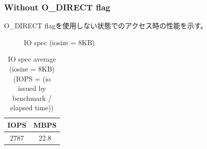 \documentclass[11pt,a4paper]{jsarticle}
\newlength{\subfigwidth}
\newlength{\subfigcolsep}
\begin{document}
\subsubsection{Without O\_DIRECT flag}
O\_DIRECT flagを使用しない状態でのアクセス時の性能を示す。
\begin{figure}[thbp]
 \setlength{\subfigwidth}{.5\linewidth}
 \addtolength{\subfigwidth}{-.5\subfigcolsep}
 \begin{minipage}[b]{\subfigwidth}
 \end{minipage}
  \begin{minipage}[b]{\subfigwidth}
  \end{minipage}
  \caption{IO spec (iosize = 8KB)}
  \label{fig:rand8192}
\end{figure}

\begin{table}[htbp]
 \begin{center}
  \caption{IO spec average (iosize = 8KB) \newline
  (IOPS = (io issued by benchmark / elapsed time))}
  \label{tbl:rand8192}
 \begin{tabular}{cc} \hline
  IOPS & MBPS \\ \hline
  2787 & 22.8 \\ \hline
 \end{tabular}
 \end{center}
\end{table}
\end{document}
